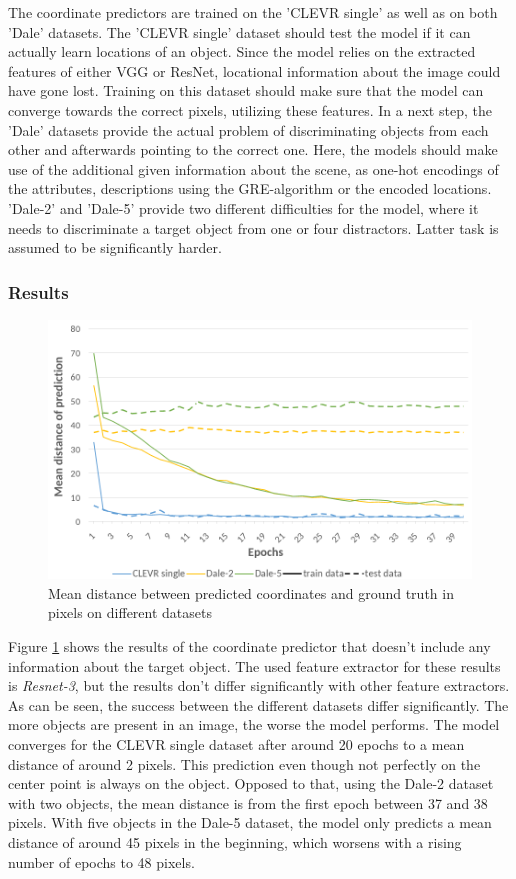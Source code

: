 The coordinate predictors are trained on the 'CLEVR single' as well as on both 'Dale' datasets.
The 'CLEVR single' dataset should test the model if it can actually learn locations of an object.
Since the model relies on the extracted features of either VGG or ResNet, locational information about the image could have gone lost.
Training on this dataset should make sure that the model can converge towards the correct pixels, utilizing these features.
In a next step, the 'Dale' datasets provide the actual problem of discriminating objects from each other and afterwards pointing to the correct one.
Here, the models should make use of the additional given information about the scene, as one-hot encodings of the attributes, descriptions using the GRE-algorithm or the encoded locations.
'Dale-2' and 'Dale-5' provide two different difficulties for the model, where it needs to discriminate a target object from one or four distractors.
Latter task is assumed to be significantly harder.

\subsubsection*{Results}

\begin{figure}[h]
    \centering
    \includegraphics[width=0.8\linewidth]{figures/coordinate-predictor_loss.png}
    \caption{Mean distance between predicted coordinates and ground truth in pixels on different datasets}
    \label{fig:coordinate-predictor_loss}
\end{figure}

Figure \ref{fig:coordinate-predictor_loss} shows the results of the coordinate predictor that doesn't include any information about the target object.
The used feature extractor for these results is \emph{Resnet-3}, but the results don't differ significantly with other feature extractors.
As can be seen, the success between the different datasets differ significantly.
The more objects are present in an image, the worse the model performs.
The model converges for the CLEVR single dataset after around 20 epochs to a mean distance of around 2 pixels.
This prediction even though not perfectly on the center point is always on the object.
Opposed to that, using the Dale-2 dataset with two objects, the mean distance is from the first epoch between 37 and 38 pixels.
With five objects in the Dale-5 dataset, the model only predicts a mean distance of around 45 pixels in the beginning, which worsens with a rising number of epochs to 48 pixels.


